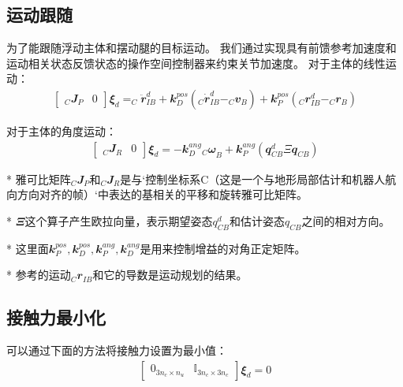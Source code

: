 \subsection{运动跟随}
为了能跟随浮动主体和摆动腿的目标运动。
我们通过实现具有前馈参考加速度和运动相关状态反馈状态的操作空间控制器来约束关节加速度。
对于主体的线性运动：
\begin{align}
    \begin{bmatrix}
    _C{\mathbfit J}_P & {\mathbfit 0}
    \end{bmatrix} 
    {\mathbfit \xi}_d = _C\ddot {\mathbfit r}_{IB}^d 
    + {\mathbfit k}_D^{pos}(_C \dot{\mathbfit r}_{IB}^d-_C{\mathbfit v}_B) 
    + {\mathbfit k}_P^{pos}(_C{\mathbfit r}_{IB}^d-_C{\mathbfit r}_B)
\end{align}

对于主体的角度运动：
\begin{align}
    \begin{bmatrix}
    _C{\mathbfit J}_R & {\mathbfit 0}
    \end{bmatrix} 
    {\mathbfit \xi}_d = 
    - {\mathbfit k}_D^{ang} {_C{\mathbfit \omega}}_{B}
    + {\mathbfit k}_P^{ang}({\mathbfit q}_{CB}^d \Xi {\mathbfit q}_{CB})
\end{align}

* 雅可比矩阵$_C{\mathbfit J}_P$和$_C{\mathbfit J}_R$是与`控制坐标系C（这是一个与地形局部估计和机器人航向方向对齐的帧）`中表达的基相关的平移和旋转雅可比矩阵。

* ${\mathbfit \Xi}$这个算子产生欧拉向量，表示期望姿态$q^d_{CB}$和估计姿态$q_{CB}$之间的相对方向。

* 这里面${\mathbfit k}_P^{pos}, {\mathbfit k}_D^{pos}, {\mathbfit k}_P^{ang}, {\mathbfit k}_D^{ang}$是用来控制增益的对角正定矩阵。

* 参考的运动$_C{\mathbfit r}_{IB}$和它的导数是运动规划的结果。

\subsection{接触力最小化}
可以通过下面的方法将接触力设置为最小值：
\begin{align}
    \begin{bmatrix}
    {\mathbfit 0}_{3n_c \times n_u} & {\mathbb I}_{3n_c \times 3n_c}
    \end{bmatrix}
    {\mathbfit \xi}_d = 0
\end{align}

